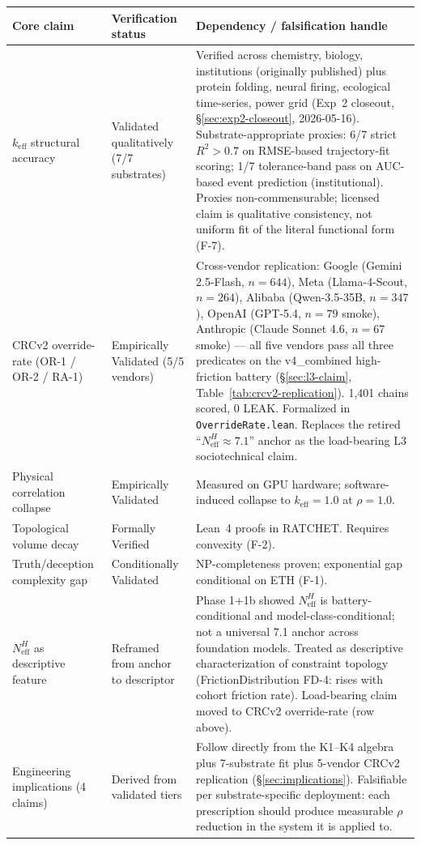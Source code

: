 \documentclass[11pt,a4paper]{article}
\begin{document}
\begin{table}[h]
\centering
\small
\begin{tabular}{p{4.5cm}p{3.5cm}p{6.5cm}}
\toprule
\textbf{Core claim} & \textbf{Verification status} & \textbf{Dependency / falsification handle} \\
\midrule
$k_{\text{eff}}$ structural accuracy & Validated qualitatively (7/7 substrates) & Verified across chemistry, biology, institutions (originally published) plus protein folding, neural firing, ecological time-series, power grid (Exp~2 closeout, \S\ref{sec:exp2-closeout}, 2026-05-16). Substrate-appropriate proxies: 6/7 strict $R^2 > 0.7$ on RMSE-based trajectory-fit scoring; 1/7 tolerance-band pass on AUC-based event prediction (institutional). Proxies non-commensurable; licensed claim is qualitative consistency, not uniform fit of the literal functional form (F-7). \\
CRCv2 override-rate (OR-1 / OR-2 / RA-1) & Empirically Validated (5/5 vendors) & Cross-vendor replication: Google (Gemini 2.5-Flash, $n=644$), Meta (Llama-4-Scout, $n=264$), Alibaba (Qwen-3.5-35B, $n=347$), OpenAI (GPT-5.4, $n=79$ smoke), Anthropic (Claude Sonnet 4.6, $n=67$ smoke) — all five vendors pass all three predicates on the v4\_combined high-friction battery (\S\ref{sec:l3-claim}, Table~\ref{tab:crcv2-replication}). 1,401 chains scored, 0 LEAK. Formalized in \texttt{OverrideRate.lean}. Replaces the retired ``$N_{\text{eff}}^H \approx 7.1$'' anchor as the load-bearing L3 sociotechnical claim. \\
Physical correlation collapse & Empirically Validated & Measured on GPU hardware; software-induced collapse to $k_{\text{eff}} = 1.0$ at $\rho = 1.0$. \\
Topological volume decay & Formally Verified & Lean~4 proofs in RATCHET. Requires convexity (F-2). \\
Truth/deception complexity gap & Conditionally Validated & NP-completeness proven; exponential gap conditional on ETH (F-1). \\
$N_{\text{eff}}^H$ as descriptive feature & Reframed from anchor to descriptor & Phase 1+1b showed $N_{\text{eff}}^H$ is battery-conditional and model-class-conditional; not a universal 7.1 anchor across foundation models. Treated as descriptive characterization of constraint topology (FrictionDistribution FD-4: rises with cohort friction rate). Load-bearing claim moved to CRCv2 override-rate (row above). \\
Engineering implications (4 claims) & Derived from validated tiers & Follow directly from the K1--K4 algebra plus 7-substrate fit plus 5-vendor CRCv2 replication (\S\ref{sec:implications}). Falsifiable per substrate-specific deployment: each prescription should produce measurable $\rho$ reduction in the system it is applied to. \\

\end{tabular}
\end{table}
\end{document}
